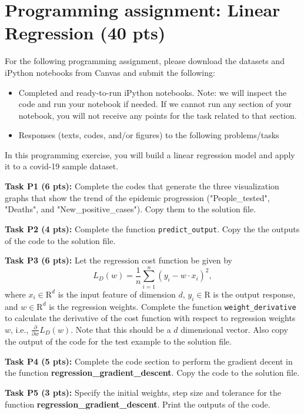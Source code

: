\documentclass[12pt]{article}
\begin{document}
\section{Programming assignment: Linear Regression (40 pts)}
\label{sec:s5}

For the following programming assignment, please download the datasets and iPython notebooks from Canvas and submit the following:
\begin{itemize}
    \item Completed and ready-to-run iPython notebooks. Note: we will inspect the code and run your notebook if needed. If we cannot run any section of your notebook, you will not receive any points for the task related to that section. 
    \item Responses (texts, codes, and/or figures) to the following problems/tasks
\end{itemize}


In this programming exercise, you will build a linear regression model and apply it to a covid-19 sample dataset. 


\textbf{Task P1 (6 pts):} Complete the codes that generate the three visualization graphs that show the trend of the epidemic progression ("People\_tested", "Deaths", and "New\_positive\_cases"). Copy them to the solution file.

\textbf{Task P2 (4 pts):} Complete the function \texttt{predict\_output}. Copy the the outputs of the code to the solution file.

\textbf{Task P3 (6 pts):} Let the regression cost function be given by
$$L_D(w) = \frac{1}{n}\sum_{i=1}^n (y_i-w\cdot x_i)^2,$$
where $x_i\in \mathrm{R}^d$ is the input feature of dimension $d$, $y_i\in\mathrm{R}$ is the output response, and $w\in\mathrm{R}^d$ is the regression weights. Complete the function \texttt{weight\_derivative} to calculate the derivative of the cost function with respect to regression weights $w$, i.e., $\frac{\partial}{\partial w}L_D(w)$. Note that this should be a $d$ dimensional vector. Also copy the output of the code for the test example to the solution file.

\textbf{Task P4  (5 pts):}  Complete the code section to perform the gradient decent in the function \textbf{regression\_gradient\_descent}. Copy the code to the solution file.


\textbf{Task P5 (3 pts):} Specify the initial weights, step size and tolerance for the function \textbf{regression\_gradient\_descent}. Print the outputs of the code.
\end{document}
